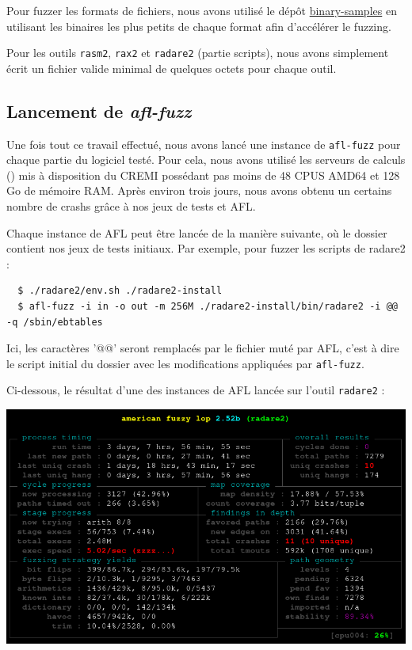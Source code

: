 Pour fuzzer les formats de fichiers, nous avons utilisé le dépôt \href{https://github.com/JonathanSalwan/binary-samples}{binary-samples} en utilisant les binaires les plus petits de chaque format afin d'accélérer le fuzzing.

Pour les outils \lstinline{rasm2}, \lstinline{rax2} et \lstinline{radare2} (partie scripts), nous avons simplement écrit un fichier valide minimal de quelques octets pour chaque outil.

\subsection{Lancement de \emph{afl-fuzz}}

Une fois tout ce travail effectué, nous avons lancé une instance de \lstinline{afl-fuzz} pour chaque partie du logiciel testé.
Pour cela, nous avons utilisé les serveurs de calculs () mis à disposition du CREMI possédant pas moins de 48 CPUS AMD64 et 128 Go de mémoire RAM.
Après environ trois jours, nous avons obtenu un certains nombre de crashs grâce à nos jeux de tests et AFL.

Chaque instance de AFL peut être lancée de la manière suivante, où le dossier  contient nos jeux de tests initiaux.
Par exemple, pour fuzzer les scripts de radare2 :

\begin{lstlisting}
  $ ./radare2/env.sh ./radare2-install
  $ afl-fuzz -i in -o out -m 256M ./radare2-install/bin/radare2 -i @@ -q /sbin/ebtables
\end{lstlisting}

Ici, les caractères '@@' seront remplacés par le fichier muté par AFL, c'est à dire le script initial du dossier  avec les modifications appliquées par \lstinline{afl-fuzz}.

Ci-dessous, le résultat d'une des instances de AFL lancée sur l'outil \lstinline{radare2} :

\includegraphics[width=0.9\linewidth]{../medias/afl-fuzz.png}

